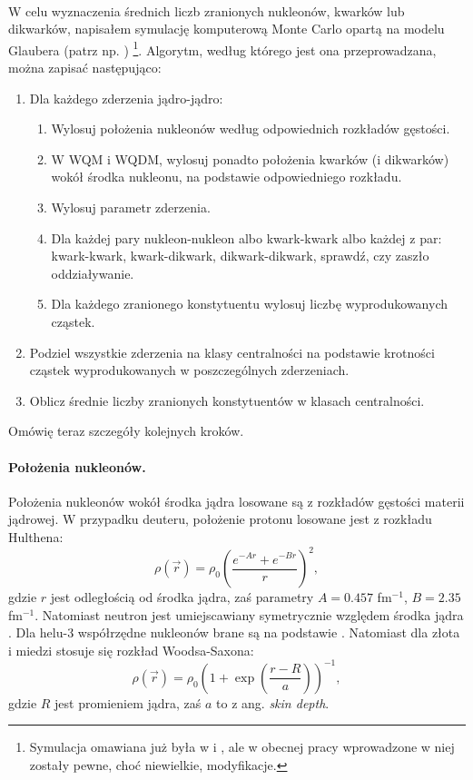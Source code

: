 \documentclass[a4paper,12pt]{article}
\begin{document}
\paragraph{}
W celu wyznaczenia średnich liczb zranionych nukleonów, kwarków lub dikwarków, napisałem symulację komputerową Monte Carlo opartą na modelu Glaubera (patrz np. \cite{Loizides:2014vua}) \footnote{Symulacja omawiana już była w \cite{Barej:pracaInz18} i \cite{Barej:2017kcw}, ale w obecnej pracy wprowadzone w niej zostały pewne, choć niewielkie, modyfikacje.}. Algorytm, według którego jest ona przeprowadzana, można zapisać następująco:
\begin{enumerate}
	\item Dla każdego zderzenia jądro-jądro:
	\begin{enumerate}
		\item Wylosuj położenia nukleonów według odpowiednich rozkładów gęstości.
		\item W WQM i WQDM, wylosuj ponadto położenia kwarków (i dikwarków) wokół środka nukleonu, na podstawie odpowiedniego rozkładu.
		\item Wylosuj parametr zderzenia.
		\item Dla każdej pary nukleon-nukleon albo kwark-kwark albo każdej z par: kwark-kwark, kwark-dikwark, dikwark-dikwark, sprawdź, czy zaszło oddziaływanie.
		\item Dla każdego zranionego konstytuentu wylosuj liczbę wyprodukowanych cząstek.
	\end{enumerate}
	\item Podziel wszystkie zderzenia na klasy centralności na podstawie krotności cząstek wyprodukowanych w poszczególnych zderzeniach.
	\item Oblicz średnie liczby zranionych konstytuentów w klasach centralności.
\end{enumerate}

Omówię teraz szczegóły kolejnych kroków.

\paragraph{Położenia nukleonów.}
Położenia nukleonów wokół środka jądra losowane są z rozkładów gęstości materii jądrowej. W przypadku deuteru, położenie protonu losowane jest z rozkładu Hulthena:
\begin{equation}
\rho(\vec{r})=\rho_0 \left(\frac{e^{-Ar}+e^{-Br}}{r}\right)^2,
\end{equation}
gdzie $r$ jest odległością od środka jądra, zaś parametry $A=0.457$ fm$^{-1}$, $B=2.35$ fm$^{-1}$. Natomiast neutron jest umiejscawiany symetrycznie względem środka jądra \cite{hulthen,Loizides:2014vua}. Dla helu-3 współrzędne nukleonów brane są na podstawie \cite{Carlson:1997qn}. Natomiast dla złota i miedzi stosuje się rozkład Woodsa-Saxona:
\begin{equation}
\rho(\vec{r})=\rho_0 \left( 1 + \exp \left( \frac{r - R}{a}\right)\right)^{-1},
\end{equation}
gdzie $R$ jest promieniem jądra, zaś $a$ to z ang. \textit{skin depth}.
\end{document}
